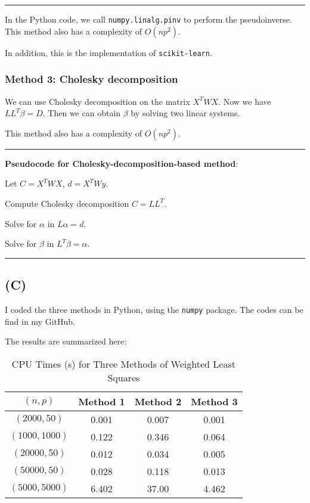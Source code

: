 \documentclass[a4paper,11pt]{article}
\begin{document}
\noindent\rule{\textwidth}{1pt}


In the Python code, we call \texttt{numpy.linalg.pinv} to perform the pseudoinverse. This method also has a complexity of $O(np^2)$.

In addition, this is the implementation of \texttt{scikit-learn}.



\subsubsection{Method 3: Cholesky decomposition}

We can use Cholesky decomposition on the matrix $X^TWX$. Now we have $LL^T \beta  = D$. Then we can obtain $\beta$ by solving two linear systems.

This method also has a complexity of $O(np^2)$.

\noindent\rule{\textwidth}{1pt}
\textbf{Pseudocode for Cholesky-decomposition-based method}:
\begin{adjustwidth}{1cm}{1cm}
{\parindent0pt
Let $C = X^TWX$, $d=X^TWy$. 

Compute Cholesky decomposition $C = LL^T$.

Solve for $\alpha$ in $L\alpha=d$.

Solve for $\beta$ in $L^T {\beta}=\alpha$.
}
\end{adjustwidth}	
\noindent\rule{\textwidth}{1pt}

\subsection{(C)}

I coded the three methods in Python, using the \texttt{numpy} package. The codes can be find in my GitHub.

The results are summarized here:

\begin{table}[!h]
\caption{CPU Times (s) for Three Methods of Weighted Least Squares}
\centering
\begin{tabular}{c c c c }
\firsthline
$(n,p)$&  Method 1 & Method 2 &Method 3  \\
\hline
$(2000,50)$& 0.001 & 0.007 & 0.001  \\
$(1000,1000)$ & 0.122 & 0.346 & 0.064  \\
$(20000,50)$ & 0.012 & 0.034 & 0.005  \\
$(50000,50)$ & 0.028& 0.118 & 0.013  \\
$(5000,5000)$ &  6.402 & 37.00 & 4.462\\
\hline
\end{tabular}
\end{table}
\end{document}

